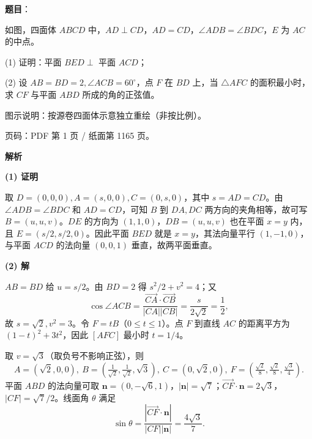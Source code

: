\begin{answer}

\textbf{题目}：

如图，四面体 $ABCD$ 中，$AD\perp CD$，$AD=CD$，$\angle ADB=\angle BDC$，$E$ 为 $AC$ 的中点。

  (1) 证明：平面 $BED\perp$ 平面 $ACD$；

  (2) 设 $AB=BD=2,\angle ACB=60^\circ$，点 $F$ 在 $BD$ 上，当 $\triangle AFC$ 的面积最小时，求 $CF$ 与平面 $ABD$ 所成的角的正弦值。

\begin{gktip}
图示说明：按源卷四面体示意独立重绘（非按比例）。
\end{gktip}
\nopagebreak[4]
\begin{center}\end{center}
\nopagebreak[4]
\begin{gktip}

页码：PDF 第 1 页 / 纸面第 1165 页。
\end{gktip}

\textbf{解析}

\textbf{(1) 证明}

取 $D=(0,0,0),A=(s,0,0),C=(0,s,0)$，其中 $s=AD=CD$。由 $\angle ADB=\angle BDC$ 和 $AD=CD$，可知 $B$ 到 $DA,DC$ 两方向的夹角相等，故可写 $B=(u,u,v)$。$DE$ 的方向为 $(1,1,0)$，$DB=(u,u,v)$ 也在平面 $x=y$ 内，且 $E=(s/2,s/2,0)$。因此平面 $BED$ 就是 $x=y$，其法向量平行 $(1,-1,0)$，与平面 $ACD$ 的法向量 $(0,0,1)$ 垂直，故两平面垂直。

\textbf{(2) 解}

$AB=BD$ 给 $u=s/2$。由 $BD=2$ 得 $s^2/2+v^2=4$；又
\nopagebreak[4]
\[
\cos\angle ACB=\frac{\overrightarrow{CA}\cdot\overrightarrow{CB}}{|CA||CB|}
=\frac{s}{2\sqrt2}=\frac12,
\]
故 $s=\sqrt2,v^2=3$。令 $F=tB$（$0\le t\le1$）。点 $F$ 到直线 $AC$ 的距离平方为 $(1-t)^2+3t^2$，因此 $[AFC]$ 最小时 $t=1/4$。

取 $v=\sqrt3$（取负号不影响正弦），则
\nopagebreak[4]
\[
A=(\sqrt2,0,0),\ B=(\tfrac1{\sqrt2},\tfrac1{\sqrt2},\sqrt3),\
C=(0,\sqrt2,0),\ F=(\tfrac{\sqrt2}8,\tfrac{\sqrt2}8,\tfrac{\sqrt3}4).
\]
平面 $ABD$ 的法向量可取 $\boldsymbol n=(0,-\sqrt6,1)$，$|\boldsymbol n|=\sqrt7$；$\overrightarrow{CF}\cdot\boldsymbol n=2\sqrt3$，$|CF|=\sqrt7/2$。线面角 $\theta$ 满足
\nopagebreak[4]
\[
\sin\theta=\frac{|\overrightarrow{CF}\cdot\boldsymbol n|}{|CF||\boldsymbol n|}=\frac{4\sqrt3}{7}.
\]



\end{answer}
